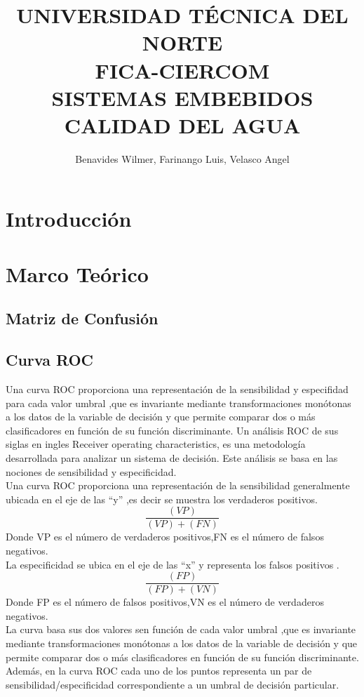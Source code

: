 \documentclass[10pt,a4paper]{article}
\begin{document}
\author{Benavides Wilmer, Farinango Luis, Velasco Angel}
\title{UNIVERSIDAD TÉCNICA DEL NORTE \\
FICA-CIERCOM\\
SISTEMAS EMBEBIDOS\\
CALIDAD DEL AGUA }
\maketitle
\section{Introducción}
\section{Marco Teórico}
\subsection{Matriz de Confusión}
\subsection{Curva ROC}
Una curva ROC proporciona una representación de la sensibilidad y especifidad para cada valor umbral ,que es invariante mediante transformaciones monótonas a los datos de la variable de decisión y que permite comparar dos o más clasificadores en función de su función discriminante.
Un análisis ROC de sus siglas en ingles Receiver operating characteristics, es una metodología desarrollada para analizar un sistema de decisión. Este análisis se basa en las nociones de sensibilidad y especificidad.\\
Una curva ROC proporciona una representación de la sensibilidad generalmente ubicada en el eje de las “y” ,es decir se muestra los verdaderos positivos.
\begin{equation}
 \frac{(VP)}{ (VP)+  (FN)}
\end{equation}
Donde VP es el número de verdaderos positivos,FN es el número de falsos negativos.\\
La especificidad se ubica en el eje de las “x” y representa los falsos positivos .
\begin{equation}
 \frac{(FP)}{ (FP)+  (VN)}
\end{equation}
Donde FP es el número de falsos positivos,VN es el número de verdaderos negativos.\\
La curva basa sus dos valores sen función de cada valor umbral ,que es invariante mediante transformaciones monótonas a los datos de la variable de decisión y que permite comparar dos o más clasificadores en función de su función discriminante.
Además, en la curva ROC cada uno de los puntos representa un par de sensibilidad/especificidad correspondiente a un umbral de decisión particular.
\end{document}
